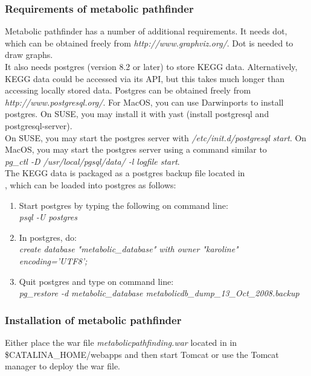 \documentclass{book}
\begin{document}
\subsubsection{Requirements of metabolic pathfinder}

Metabolic pathfinder has a number of additional requirements.
It needs dot, which can be obtained freely from \textit{http://www.graphviz.org/}.
Dot is needed to draw graphs.\\

It also needs postgres (version 8.2 or later) to store KEGG data.
Alternatively, KEGG data could be accessed via its API,
but this takes much longer than accessing locally stored data.
Postgres can be obtained freely from
\textit{http://www.postgresql.org/}.
For MacOS, you can use Darwinports to install postgres. On SUSE, you may
install it with yast (install postgresql and postgresql-server).\\

On SUSE, you may start the postgres server with
\textit{/etc/init.d/postgresql start}. On MacOS, you may start the postgres server
using a command similar to\\
\textit{pg\_ctl -D /usr/local/pgsql/data/ -l logfile start}.\\

The KEGG data is packaged as a postgres backup file located in\\
,
which can be loaded into postgres as follows:
\begin{enumerate}
\item Start postgres by typing the following on command line:\\
\textit{psql -U postgres}
\item In postgres, do:\\
\textit{create database "metabolic\_database" with owner "karoline" encoding='UTF8';}
\item Quit postgres and type on command line:\\
\textit{pg\_restore -d metabolic\_database metabolicdb\_dump\_13\_Oct\_2008.backup}
\end{enumerate}

\subsubsection{Installation of metabolic pathfinder}
Either place the war file \textit{metabolicpathfinding.war} located
in  in\\
\$CATALINA\_HOME/webapps and then start
Tomcat or use the Tomcat manager to deploy the war file.
\end{document}
